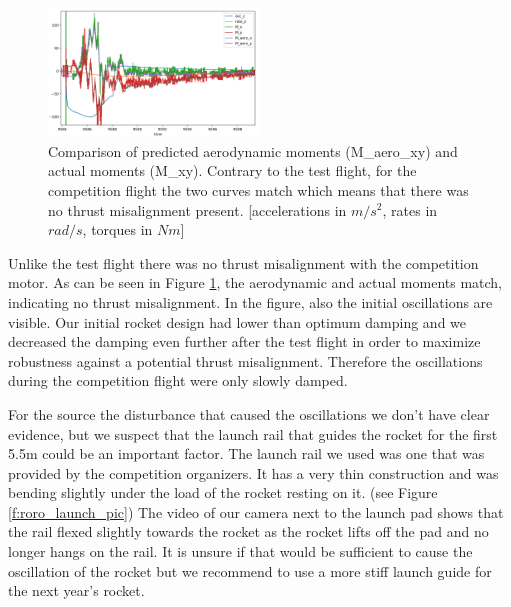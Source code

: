 \begin{figure}[h!]
    \centering
        \includegraphics[width=0.5\textwidth]{img/competition_flight_graph.png}
        \caption{Comparison of predicted aerodynamic moments (M_aero_xy) and actual moments (M_xy). Contrary to the test flight, for the competition flight the two curves match which means that there was no thrust misalignment present. [accelerations in $m/s^2$, rates in $rad/s$, torques in $Nm$]}
        \label{f:comp_graph}
 \end{figure}

Unlike the test flight there was no thrust misalignment with the competition motor. As can be seen in Figure \ref{f:comp_graph}, the aerodynamic and actual moments match, indicating no thrust misalignment.
In the figure, also the initial oscillations are visible.
Our initial rocket design had lower than optimum damping and we decreased the damping even further after the test flight in order to maximize robustness against a potential thrust misalignment.
Therefore the oscillations during the competition flight were only slowly damped.

For the source the disturbance that caused the oscillations we don't have clear evidence, but we suspect that the launch rail that guides the rocket for the first 5.5m could be an important factor.
The launch rail we used was one that was provided by the competition organizers.
It has a very thin construction and was bending slightly under the load of the rocket resting on it. (see Figure \ref{f:roro_launch_pic})
The video of our camera next to the launch pad shows that the rail flexed slightly towards the rocket as the rocket lifts off the pad and no longer hangs on the rail.
It is unsure if that would be sufficient to cause the oscillation of the rocket but we recommend to use a more stiff launch guide for the next year's rocket.

